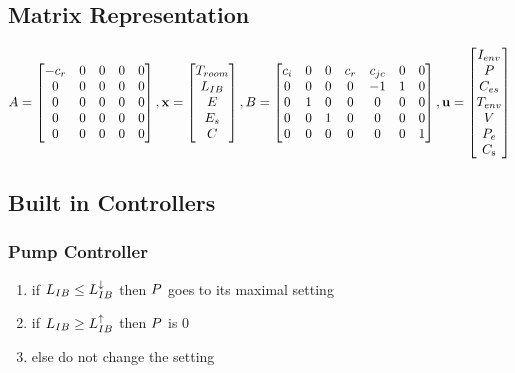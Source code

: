 \subsection{Matrix Representation}




$A = 
\begin{bmatrix}
  -c_{r} & 0 & 0 & 0 & 0\\
  0 & 0 & 0 & 0 & 0\\
  0 & 0 & 0 & 0 & 0\\
  0 & 0 & 0 & 0 & 0\\
  0 & 0 & 0 & 0 & 0
\end{bmatrix},
\mathbf{x} =
\begin{bmatrix}
  T_{room} \\
  L_{IB}\\
  E\\
  E_{s}\\
  C
\end{bmatrix},
B = 
\begin{bmatrix}
  c_{i} & 0 & 0 & c_{r} & c_{jc} & 0 & 0\\
  0 & 0 & 0 & 0 & -1 & 1 & 0\\
  0 & 1 & 0 & 0 & 0 & 0 & 0\\
  0 & 0 & 1 & 0 & 0 & 0 & 0\\
  0 & 0 & 0 & 0 & 0 & 0 & 1
\end{bmatrix},
\mathbf{u} =
\begin{bmatrix}
  I_{env}\\
  P\\
  C_{es}\\
  T_{env}\\
  V\\
  P_{e}\\
  C_{\si{\second}}
\end{bmatrix}
$

\subsection{Built in Controllers}

\subsubsection{Pump Controller}
\begin{enumerate}
\item
  if $L_{IB} \leq L^{\downarrow}_{IB}$ then $P$ goes to its maximal
  setting
\item
  if $L_{IB} \geq L^{\uparrow}_{IB}$ then $P$ is 0
\item
  else do not change the setting
\end{enumerate}

